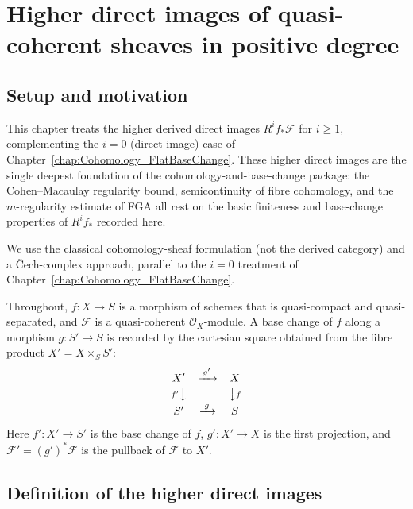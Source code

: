 \chapter{Higher direct images of quasi-coherent sheaves in positive degree}
\label{chap:Cohomology_HigherDirectImage}

\section{Setup and motivation}

This chapter treats the higher derived direct images \(R^i f_*\mathcal{F}\) for
\(i \geq 1\), complementing the \(i = 0\) (direct-image) case of
Chapter~\ref{chap:Cohomology_FlatBaseChange}. These higher direct images are the
single deepest foundation of the cohomology-and-base-change package: the
Cohen--Macaulay regularity bound, semicontinuity of fibre cohomology, and the
\(m\)-regularity estimate of FGA all rest on the basic finiteness and base-change
properties of \(R^i f_*\) recorded here.

We use the classical cohomology-sheaf formulation (not the derived category) and a
{\v C}ech-complex approach, parallel to the \(i = 0\) treatment of
Chapter~\ref{chap:Cohomology_FlatBaseChange}.

Throughout, \(f : X \to S\) is a morphism of schemes that is quasi-compact and
quasi-separated, and \(\mathcal{F}\) is a quasi-coherent \(\mathcal{O}_X\)-module.
A base change of \(f\) along a morphism \(g : S' \to S\) is recorded by the
cartesian square obtained from the fibre product \(X' = X \times_S S'\):
\[
  \begin{array}{ccc}
    X' & \xrightarrow{\;g'\;} & X \\[2pt]
    {\scriptstyle f'}\big\downarrow & & \big\downarrow{\scriptstyle f} \\[2pt]
    S' & \xrightarrow{\;g\;} & S
  \end{array}
\]
Here \(f' : X' \to S'\) is the base change of \(f\), \(g' : X' \to X\) is the first
projection, and \(\mathcal{F}' = (g')^*\mathcal{F}\) is the pullback of
\(\mathcal{F}\) to \(X'\).

\section{Definition of the higher direct images}

